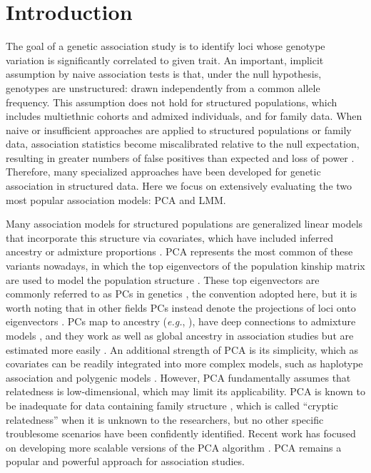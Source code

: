 \documentclass[11pt]{article}
\begin{document}
\section{Introduction} 

The goal of a genetic association study is to identify loci whose genotype variation is significantly correlated to given trait.
An important, implicit assumption by naive association tests is that, under the null hypothesis, genotypes are unstructured: drawn independently from a common allele frequency.
This assumption does not hold for structured populations, which includes multiethnic cohorts and admixed individuals, and for family data.
When naive or insufficient approaches are applied to structured populations or family data, association statistics become miscalibrated relative to the null expectation, resulting in greater numbers of false positives than expected and loss of power \citep{devlin_genomic_1999, voight_confounding_2005, astle_population_2009}.
Therefore, many specialized approaches have been developed for genetic association in structured data.
Here we focus on extensively evaluating the two most popular association models: PCA and LMM.

Many association models for structured populations are generalized linear models that incorporate this structure via covariates, which have included inferred ancestry or admixture proportions \citep{pritchard_association_2000}.
PCA represents the most common of these variants nowadays, in which the top eigenvectors of the population kinship matrix are used to model the population structure \citep{zhang_semiparametric_2003, price_principal_2006, bouaziz_accounting_2011}.
These top eigenvectors are commonly referred to as PCs in genetics \citep{patterson_population_2006}, the convention adopted here, but it is worth noting that in other fields PCs instead denote the projections of loci onto eigenvectors \citep{jolliffe_principal_2002}.
PCs map to ancestry (\textit{e.g.}, \cite{alexander_fast_2009, zhou_strong_2016}), have deep connections to admixture models \citep{mcvean_genealogical_2009,zheng_eigenanalysis_2016,cabreros_likelihood-free_2019}, and they work as well as global ancestry in association studies but are estimated more easily \citep{patterson_population_2006, zhao_arabidopsis_2007, alexander_fast_2009, bouaziz_accounting_2011}.
An additional strength of PCA is its simplicity, which as covariates can be readily integrated into more complex models, such as haplotype association \citep{xu_detecting_2014} and polygenic models \citep{qian_fast_2020}.
However, PCA fundamentally assumes that relatedness is low-dimensional, which may limit its applicability.
PCA is known to be inadequate for data containing family structure \citep{patterson_population_2006, thornton_roadtrips:_2010, price_new_2010}, which is called ``cryptic relatedness'' when it is unknown to the researchers, but no other specific troublesome scenarios have been confidently identified.
Recent work has focused on developing more scalable versions of the PCA algorithm \citep{lee_sparse_2012, abraham_fast_2014, galinsky_fast_2016, abraham_flashpca2:_2017, agrawal_scalable_2020}.
PCA remains a popular and powerful approach for association studies.
\end{document}
